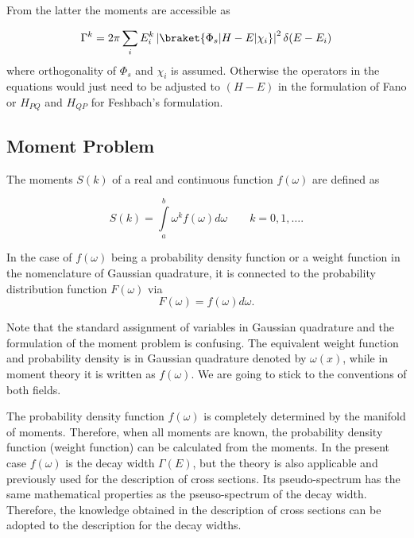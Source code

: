 From the latter the moments are accessible as

\begin{equation}
  \Gamma^k = 2\pi \sum\limits_i E_i^k \left| \braket{\Phi_s|H-E|\chi_i} \right| ^2
           \delta(E-E_i)
\end{equation}
where orthogonality of $\Phi_s$ and $\chi_i$ is assumed. Otherwise the operators
in the equations would just need to be adjusted to $(H-E)$ in the formulation
of Fano or $H_{PQ}$ and $H_{QP}$ for Feshbach's formulation.



\subsection{Moment Problem}

The moments $S(k)$ of a real and continuous function $f(\omega)$ are defined
as \cite{MuellerPlathe90}

\begin{equation}
  S(k) = \int\limits_a^b \omega^k f(\omega) d\omega \quad\quad k=0,1,\dots  .
\end{equation}

In the case of $f(\omega)$ being a probability density function or a weight function
in the nomenclature of Gaussian quadrature, it is connected
to the probability distribution function $F(\omega)$ via
\begin{equation}
  F(\omega) = f(\omega){d\omega} .
\end{equation}

Note that the standard assignment of variables in Gaussian quadrature and the
formulation of the moment problem is confusing. The equivalent weight function
and probability density is in Gaussian quadrature denoted by $\omega(x)$, while
in moment theory it is written as $f(\omega)$. We are going to stick to the
conventions of both fields.

The probability density function $f(\omega)$ is completely determined by the manifold
of moments. Therefore, when all moments are known, the probability density
function  (weight function) can be calculated from the moments.
In the present case $f(\omega)$
is the decay width $\Gamma(E)$, but the theory is also applicable and previously
used for the description of cross sections. Its pseudo-spectrum has the same
mathematical properties as the pseuso-spectrum of the decay width. Therefore,
the knowledge obtained in the description of cross sections can be adopted to
the description for the decay widths.

